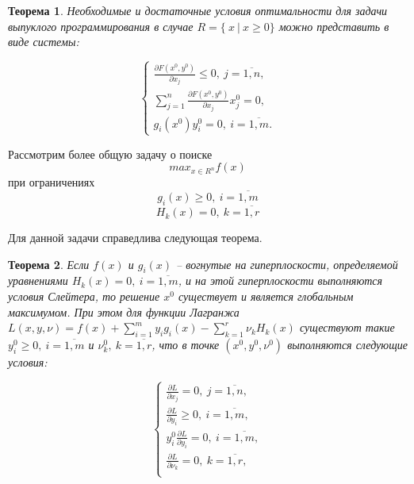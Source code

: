 \documentclass[12pt,a4paper,titlepage,oneside]{book}
\theoremstyle{definition}
\theoremstyle{plain}
\newtheorem{theorem}{Теорема}[chapter]
\theoremstyle{remark}
\theoremstyle{remark}
\theoremstyle{plain}
\theoremstyle{plain}
\begin{document}
\begin{theorem}
Необходимые и достаточные условия оптимальности для задачи выпуклого программирования в случае $R = \{~x~|~x \geqslant 0\}$ можно представить в виде системы:

$$
\begin{cases} 
\frac{\partial F(x^0,y^0)}{\partial x_j} \leqslant 0,~j=\overline{1,n},\\[2ex]
\displaystyle \sum_{j=1}^n \frac{\partial F(x^0,y^0)}{\partial x_j} x_j^0 = 0,\\[3ex]
g_i(x^0) y_i^0 = 0,~i=\overline{1,m}.
\end{cases} 
$$ 
\end{theorem}

Рассмотрим более общую задачу о поиске
$$max_{x \in \textit{R}^n} f(x)$$
при ограничениях
$$g_i(x) \geqslant 0,~i=\overline{1,m}$$
$$H_k(x)=0,~k=\overline{1,r}$$

Для данной задачи справедлива следующая теорема.

\begin{theorem}
Если $f(x)$ и $g_i(x)$ -- вогнутые на гиперплоскости, определяемой уравнениями $H_k(x) = 0, ~i=\overline{1,m}$, и на этой гиперплоскости выполняются условия Слейтера, то решение $x^0$ существует и является глобальным максимумом. При этом для функции Лагранжа $\displaystyle L(x,y,\nu) = f(x) + \sum_{i=1}^m y_i g_i(x) - \sum_{k=1}^r \nu_k H_k(x)$ существуют такие $y_i^0 \geqslant 0,~i=\overline{1,m}$ и $\nu_k^0,~k=\overline{1,r}$, что в точке $(x^0,y^0,\nu^0)$ выполняются следующие условия:

$$
\begin{cases}
\displaystyle \frac{\partial L}{\partial x_j} = 0,~j=\overline{1,n},\\[2ex]
\displaystyle \frac{\partial L}{\partial y_i} \geqslant 0,~i=\overline{1,m},\\[2ex]
\displaystyle y_i^0 \frac{\partial L}{\partial y_i} = 0,~i=\overline{1,m},\\[2ex]
\displaystyle \frac{\partial L}{\partial \nu_k} = 0,~k=\overline{1,r},\\
\end{cases}
$$

\end{theorem}
\end{document}
